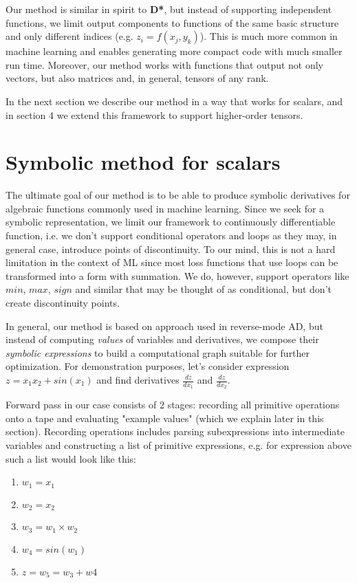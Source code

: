 \documentclass[conference]{IEEEtran}
\begin{document}
Our method is similar in spirit to \textbf{D*}, but instead of
supporting independent functions, we limit output components to
functions of the same basic structure and only different indices
(e.g. $z_i = f(x_j, y_k)$). This is much more common in machine
learning and enables generating more compact code with much smaller
run time. Moreover, our method works with functions that output not
only vectors, but also matrices and, in general, tensors of any rank.

In the next section we describe our method in a way that works for
scalars, and in section 4 we extend this framework to support
higher-order tensors.

\section{Symbolic method for scalars}

The ultimate goal of our method is to be able to produce symbolic
derivatives for algebraic functions commonly used in machine
learning. Since we seek for a symbolic representation, we limit our
framework to continuously differentiable function, i.e. we don't
support conditional operators and loops as they may, in general case,
introduce points of discontinuity. To our mind, this is not a hard
limitation in the context of ML since most loss functions that use
loops can be transformed into a form with summation. We do, however,
support operators like $min$, $max$, $sign$ and similar that may be
thought of as conditional, but don't create discontinuity points.

In general, our method is based on approach used in reverse-mode AD,
but instead of computing \textit{values} of variables and derivatives,
we compose their \textit{symbolic expressions} to build a
computational graph suitable for further optimization. For
demonstration purposes, let's consider expression
$z = x_1x_2 + sin(x_1)$ and find derivatives $\frac{dz}{dx_1}$ and
$\frac{dz}{dx_2}$.

Forward pass in our case consists of 2 stages: recording all primitive
operations onto a tape and evaluating "example values" (which we
explain later in this section). Recording operations includes parsing
subexpressions into intermediate variables and constructing a list of
primitive expressions, e.g. for expression above such a list would
look like this:

\begin{enumerate}
\item $w_1 = x_1$
\item $w_2 = x_2$
\item $w_3 = w_1 \times w_2$
\item $w_4 = sin(w_1)$
\item $z = w_5 = w_3 + w4$
\end{enumerate}
\end{document}
